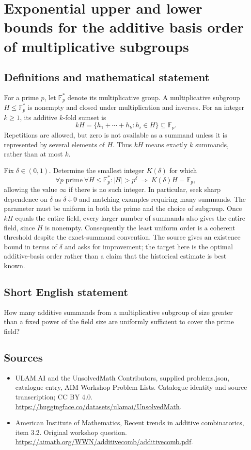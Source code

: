 \documentclass[11pt,a4paper]{article}
\begin{document}
\section*{Exponential upper and lower bounds for the additive basis order of multiplicative subgroups}\label{statement}

\subsection{Definitions and mathematical statement}
For a prime $p$, let $\mathbb F_p^*$ denote its multiplicative group.
A multiplicative subgroup $H\leq\mathbb F_p^*$ is nonempty and closed under multiplication and inverses.
For an integer $k\geq1$, its additive $k$-fold sumset is
\[
 kH=\{h_1+\cdots+h_k:h_i\in H\}\subseteq\mathbb F_p.
\]
Repetitions are allowed, but zero is not available as a summand unless it is represented by several elements of $H$.
Thus $kH$ means exactly $k$ summands, rather than at most $k$.

Fix $\delta\in(0,1)$.
Determine the smallest integer $K(\delta)$ for which
\[
 \forall p\text{ prime}\ \forall H\leq\mathbb F_p^*:
       |H|>p^\delta\ \Longrightarrow\ K(\delta)H=\mathbb F_p,
\]
allowing the value $\infty$ if there is no such integer.
In particular, seek sharp dependence on $\delta$ as $\delta\downarrow0$ and matching examples requiring many summands.
The parameter must be uniform in both the prime and the choice of subgroup.
Once $kH$ equals the entire field, every larger number of summands also gives the entire field, since $H$ is nonempty.
Consequently the least uniform order is a coherent threshold despite the exact-summand convention.
The source gives an existence bound in terms of $\delta$ and asks for improvement; the target here is the optimal additive-basis order rather than a claim that the historical estimate is best known.
\subsection{Short English statement}
How many additive summands from a multiplicative subgroup of size greater than a fixed power of the field size are uniformly sufficient to cover the prime field?
\subsection{Sources}
\begin{itemize}
\item[S1] ULAM.AI and the UnsolvedMath Contributors, supplied problems.json, catalogue entry, AIM Workshop Problem Lists. Catalogue identity and source transcription; CC BY 4.0.
\url{https://huggingface.co/datasets/ulamai/UnsolvedMath}.
\item[S2] American Institute of Mathematics, Recent trends in additive combinatorics, item 3.2. Original workshop question.
\url{https://aimath.org/WWN/additivecomb/additivecomb.pdf}.
\end{itemize}
\end{document}
